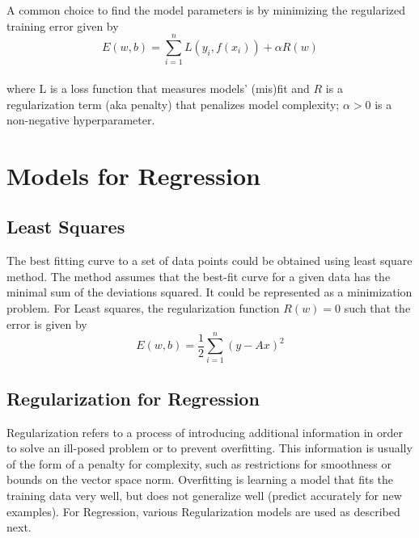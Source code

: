 \documentclass{sigplanconf}
\begin{document}
\noindent
A common choice to find the model parameters is by minimizing the regularized training error given by\\
\begin{equation} E(w,b) = \sum_{i=1}^{n} L(y_i,f(x_i)) + \alpha R(w) \end{equation} \\
where L is a loss function that measures models' (mis)fit and \begin{math}R\end{math} is a
regularization term (aka penalty) that penalizes model complexity; \begin{math}\alpha>0\end{math}
is a non-negative hyperparameter.

\section{Models for Regression}
\subsection{Least Squares}
The best fitting curve to a set of data points could be obtained using least square method. The method
assumes that the best-fit curve for a given data has the minimal sum of the deviations squared. It could
be represented as a minimization problem. For Least squares, the regularization function \begin{math}R(w)=0\end{math}
such that the error is given by \\
\begin{equation} E(w,b) =\frac{1}{2} \sum_{i=1}^{n} (y-Ax)^2\end{equation}

\subsection{Regularization for Regression}
Regularization refers to a process of introducing additional information in order to solve an ill-posed problem or to prevent overfitting. 
This information is usually of the form of a penalty for complexity, such as restrictions for smoothness or bounds on the vector space norm.
Overfitting is learning a model that fits the training data very well, but does not generalize well (predict accurately for new examples).
For Regression, various Regularization models are used as described next.
\end{document}
